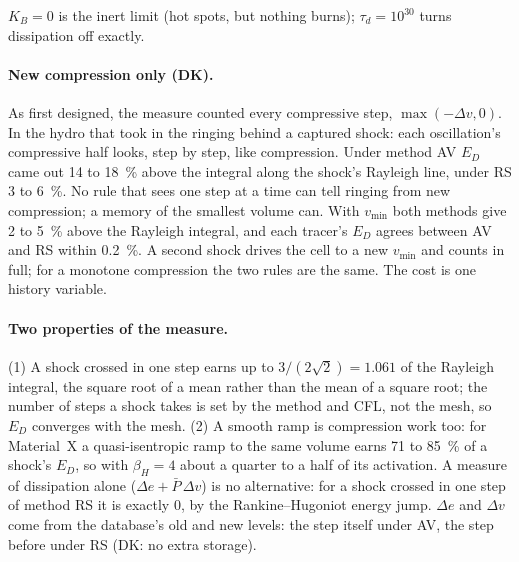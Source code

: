 $K_B = 0$ is the inert limit (hot spots, but nothing burns); $\tau_d =
10^{30}$ turns dissipation off exactly.

\paragraph{New compression only (DK).} As first designed, the measure
counted every compressive step, $\max(-\Delta v, 0)$. In the hydro that took
in the ringing behind a captured shock: each oscillation's compressive half
looks, step by step, like compression. Under method AV $E_D$ came out 14 to
18~\% above the integral along the shock's Rayleigh line, under RS 3 to
6~\%. No rule that sees one step at a time can tell ringing from new
compression; a memory of the smallest volume can. With $v_{\min}$ both
methods give 2 to 5~\% above the Rayleigh integral, and each tracer's
$E_D$ agrees between AV and RS within 0.2~\%. A second shock drives the cell
to a new $v_{\min}$ and counts in full; for a monotone compression the two
rules are the same. The cost is one history variable.

\paragraph{Two properties of the measure.} (1) A shock crossed in one step
earns up to $3/(2\sqrt2) = 1.061$ of the Rayleigh integral, the square root
of a mean rather than the mean of a square root; the number of steps a
shock takes is set by the method and CFL, not the mesh, so $E_D$ converges
with the mesh. (2) A smooth ramp is compression work too: for Material~X a
quasi-isentropic ramp to the same volume earns 71 to 85~\% of a shock's
$E_D$, so with $\beta_H = 4$ about a quarter to a half of its activation. A
measure of dissipation alone ($\Delta e + \bar P\,\Delta v$) is no
alternative: for a shock crossed in one step of method RS it is exactly 0,
by the Rankine--Hugoniot energy jump. $\Delta e$ and $\Delta v$ come from the
database's old and new levels: the step itself under AV, the step before
under RS (DK: no extra storage).

